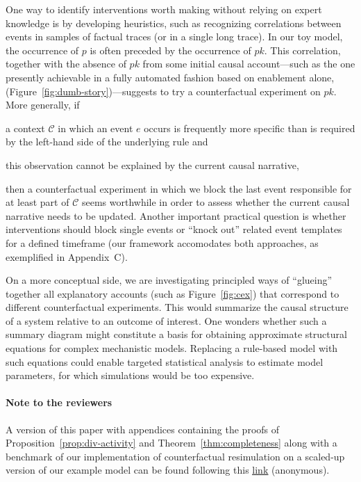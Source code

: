 One way to identify interventions worth making without relying on
expert knowledge is by developing heuristics, such as recognizing
correlations between events in samples of factual traces (or in a
single long trace). In our toy model, the occurrence of $p$ is often
preceded by the occurrence of $pk$. This correlation, together with
the absence of $pk$ from some initial causal account---such as the one
presently achievable in a fully automated fashion based on enablement
alone, (Figure~\ref{fig:dumb-story})---suggests to try a
counterfactual experiment on $pk$. More generally,
if \begin{inparaenum}[(i)] \item a context $\mathcal C$ in which an
  event $e$ occurs is frequently more specific than is required by the
  left-hand side of the underlying rule and \item this observation
  cannot be explained by the current causal
  narrative, \end{inparaenum} then a counterfactual experiment in
which we block the last event responsible for at least part of
$\mathcal C$ seems worthwhile in order to assess whether the current
causal narrative needs to be updated.  Another important practical
question is whether interventions should block single events or
``knock out'' related event templates for a defined timeframe (our
framework accomodates both approaches, as exemplified in Appendix~C).

On a more conceptual side, we are investigating principled ways of
``glueing'' together all explanatory accounts (such as
Figure~\ref{fig:cex}) that correspond to different counterfactual
experiments. This would summarize the causal structure of a system
relative to an outcome of interest. One wonders whether such a summary
diagram might constitute a basis for obtaining approximate structural
equations for complex mechanistic models. Replacing a rule-based model
with such equations could enable targeted statistical analysis to
estimate model parameters, for which simulations would be too
expensive.

\ifreview \ifincludeappendices \else
\paragraph{Note to the reviewers}
A version of this paper with appendices containing the proofs of
Proposition~\ref{prop:div-activity} and Theorem~\ref{thm:completeness}
along with a benchmark of our implementation of counterfactual
resimulation on a scaled-up version of our example model can be found
following this
\underline{\href{https://www.dropbox.com/sh/2fwji0its0o0ciq/AABfLZ-GO2wCE2x3h3ulUbB-a?dl=0}{link}}
(anonymous).
\fi
\fi